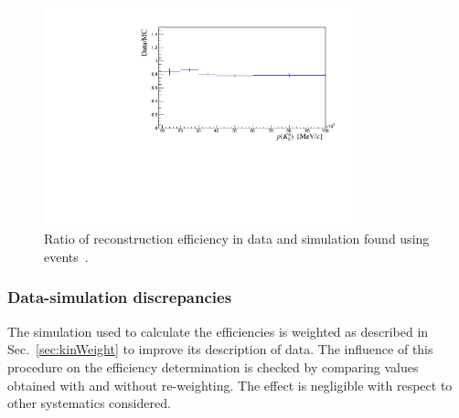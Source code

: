\begin{figure}
\centering
\includegraphics[width=0.8\textwidth]{Lmumu/figs/DDvtx_eff_POwen.pdf}
\caption{Ratio of reconstruction efficiency in data and simulation found using \KS events~\cite{Blake:1631348}.}
\label{KS_vtxeff}
\end{figure}

\subsubsection{Data-simulation discrepancies}

The simulation used to calculate the efficiencies is weighted as described in Sec.~\ref{sec:kinWeight} to 
improve its description of data.
The influence of this procedure on the efficiency determination is checked by comparing values obtained with
and without re-weighting. The effect is negligible with respect to other systematics considered.



